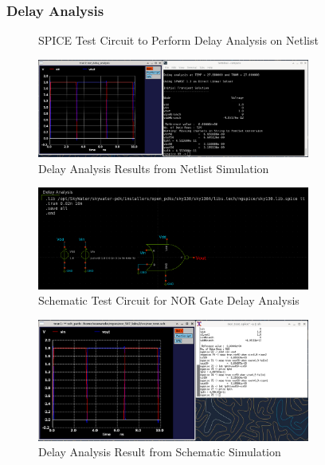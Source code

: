\documentclass{article}
\begin{document}
	\subsubsection{Delay Analysis}
	\begin{figure}[H]
		
		\caption{SPICE Test Circuit to Perform Delay Analysis on Netlist}
		\label{fig::nor_delay_analysis_test_circuit}
	\end{figure}
	
	\begin{figure}[H]
		\centerline{\includegraphics[width=0.8\textwidth]{nor_delay_analysis.png}}
		\caption{Delay Analysis Results from Netlist Simulation}
		\label{fig::nor_delay_analysis}
	\end{figure}
	
	\begin{figure}[H]
		\centerline{\includegraphics[width=0.8\textwidth]{nor_delay_analysis_test_circuit.png}}
		\caption{Schematic Test Circuit for NOR Gate Delay Analysis}
		\label{fig::nor_delay_analysis_test_circuit_schem}
	\end{figure}
	
	\begin{figure}[H]
		\centerline{\includegraphics[width=0.8\textwidth]{nor_delay_analysis_schem.png}}
		\caption{Delay Analysis Result from Schematic Simulation}
		\label{fig::nor_delay_analysis_schem}
	\end{figure}
	
\end{document}
